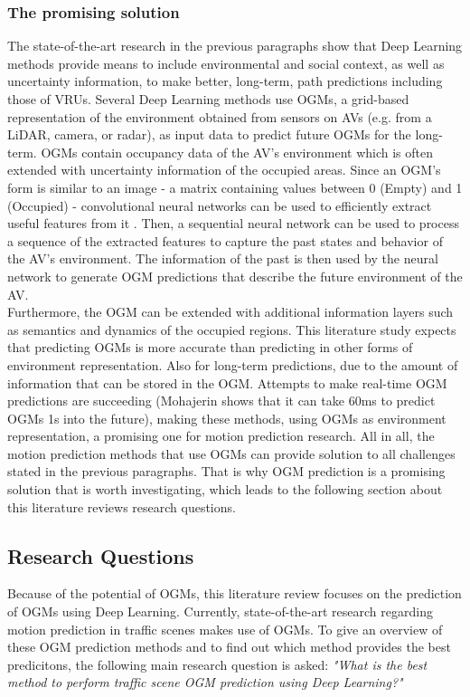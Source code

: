 \subsubsection{The promising solution}
The state-of-the-art research in the previous paragraphs show that Deep Learning methods provide means to include environmental and social context, as well as uncertainty information, to make better, long-term, path predictions including those of \glspl{VRU}. Several Deep Learning methods use \glspl{OGM}, a grid-based representation of the environment obtained from sensors on \glspl{AV} (e.g. from a LiDAR, camera, or radar), as input data to predict future \glspl{OGM} for the long-term. \glspl{OGM} contain occupancy data of the \gls{AV}'s environment which is often extended with uncertainty information of the occupied areas. 
Since an \gls{OGM}'s form is similar to an image - a matrix containing values between 0 (Empty) and 1 (Occupied) - convolutional neural networks can be used to efficiently extract useful features from it \cite{albawi2017understanding}. Then, a sequential neural network can be used to process a sequence of the extracted features to capture the past states and behavior of the \gls{AV}'s environment. The information of the past is then used by the neural network to generate \gls{OGM} predictions that describe the future environment of the \gls{AV}. \\
Furthermore, the \gls{OGM} can be extended with additional information layers such as semantics and dynamics of the occupied regions. This literature study expects that predicting \glspl{OGM} is more accurate than predicting in other forms of environment representation. Also for long-term predictions, due to the amount of information that can be stored in the \gls{OGM}. Attempts to make real-time \gls{OGM} predictions are succeeding (Mohajerin \cite{mohajerin2019multi} shows that it can take 60ms to predict \glspl{OGM} 1s into the future), making these methods, using \glspl{OGM} as environment representation, a promising one for motion prediction research. All in all, the motion prediction methods that use \glspl{OGM} can provide solution to all challenges stated in the previous paragraphs. That is why \gls{OGM} prediction is a promising solution that is worth investigating, which leads to the following section about this literature reviews research questions. \\


\subsection{Research Questions}
Because of the potential of \glspl{OGM}, this literature review focuses on the prediction of \glspl{OGM} using Deep Learning. Currently, state-of-the-art research regarding motion prediction in traffic scenes makes use of \glspl{OGM}. To give an overview of these \gls{OGM} prediction methods and to find out which method provides the best predicitons, the following main research question is asked: \textit{"What is the best method to perform traffic scene \gls{OGM} prediction using Deep Learning?"} \\

